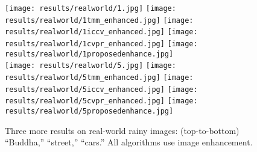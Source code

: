 \documentclass[journal]{IEEEtran}
\begin{document}
\begin{figure*}
\centering
\texttt{[image: results/realworld/1.jpg]}
\texttt{[image: results/realworld/1tmm\_enhanced.jpg]}
\texttt{[image: results/realworld/1iccv\_enhanced.jpg]}
\texttt{[image: results/realworld/1cvpr\_enhanced.jpg]}
\texttt{[image: results/realworld/1proposedenhance.jpg]}\vspace{4pt} \\

\texttt{[image: results/realworld/5.jpg]}
\texttt{[image: results/realworld/5tmm\_enhanced.jpg]}
\texttt{[image: results/realworld/5iccv\_enhanced.jpg]}
\texttt{[image: results/realworld/5cvpr\_enhanced.jpg]}
\texttt{[image: results/realworld/5proposedenhance.jpg]}\vspace{-1pt} \\

\caption{Three more results on real-world rainy images: (top-to-bottom) ``Buddha,'' ``street,'' ``cars.'' All algorithms use image enhancement.} \label{fig.real3}
\end{figure*}
\end{document}
